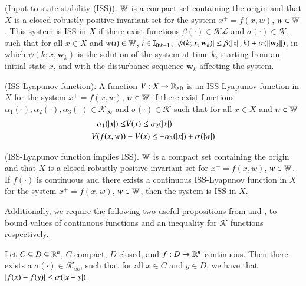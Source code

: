 \documentclass[preprint,5p, twocolumn, authoryear]{elsarticle}
\begin{document}
\begin{definition} \label{def:iss} (Input-to-state stability (ISS)). $\mathbb{W}$ is a
compact set containing the origin and that $X$ is a closed robustly positive
invariant set for the system $x^+ = f(x, w)$, $w \in \mathbb{W}$. This system is ISS
in $X$ if there exist functions $\beta(\cdot) \in \mathcal{K}\mathcal{L}$ and
$\sigma(\cdot) \in \mathcal{K}$, such that for all $x \in X$ and $w(i) \in
\mathbb{W}$, $i \in \mathbb{I}_{0:k-1}$, $\left| \psi(k; x, \mathbf{w}_k) \right| \leq
\beta(\left| x \right|, k) + \sigma(\left| \left| \mathbf{w}_k \right| \right|)$, in which $\psi(k; x,
\mathbf{w}_k)$ is the solution of the system at time $k$, starting from an
initial state $x$, and with the disturbance sequence $\mathbf{w}_k$ affecting
the system.
\end{definition}

\begin{definition} \label{def:iss_lyapunov_func} (ISS-Lyapunov function). A
function $V : X \rightarrow \mathbb{R}_{\geq 0}$ is an ISS-Lyapunov function in $X$
for the system $x^+ = f(x, w)$, $w \in \mathbb{W}$ if there exist functions
$\alpha_1(\cdot), \alpha_2(\cdot), \alpha_3(\cdot) \in \mathcal{K}_{\infty}$ and
$\sigma(\cdot) \in \mathcal{K}$ such that for all $x \in X$ and $w \in \mathbb{W}$
\begin{align*}
    \alpha_1(\left| x \right|) \leq & V(x) \leq \alpha_2(\left| x \right|) \\
    V(f(x, w)) &- V(x) \leq -\alpha_3(\left| x \right|) + \sigma(\left| w \right|)
\end{align*}
\end{definition}

\begin{prop} \label{prop:lyapunov_implies_iss} (ISS-Lyapunov function implies
ISS). $\mathbb{W}$ is a compact set containing the origin and that $X$ is a closed
robustly positive invariant set for $x^+ = f(x, w)$, $w \in \mathbb{W}$. If $f(\cdot)$
is continuous and there exists a continuous ISS-Lyapunov function in $X$ for the
system $x^+ = f(x, w)$, $w \in \mathbb{W}$, then the system is ISS in $X$.
\end{prop}

Additionally, we require the following two useful propositions from
\cite*{allan:bates:risbeck:rawlings:2017} and \cite*{rawlings:ji:2012}, to bound
values of continuous functions and an inequality for $\mathcal{K}$ functions
respectively.

\begin{prop} \label{prop:continuous_funcs} Let $C \subseteq D \subseteq \mathbb{R}^n$,
    $C$ compact, $D$ closed, and $f : D \rightarrow \mathbb{R}^n$ continuous.  
    Then there exists a $\sigma(\cdot) \in \mathcal{K}_{\infty}$, such that for
    all $x \in C$ and $y \in D$, we have that $\left| f(x) - f(y) \right| \leq
    \sigma(\left| x-y \right|)$.
\end{prop}
    
\end{document}
